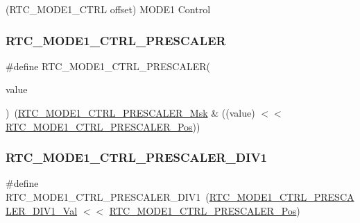 (R\+T\+C\+\_\+\+M\+O\+D\+E1\+\_\+\+C\+T\+RL offset) M\+O\+D\+E1 Control 

\mbox{\label{group___s_a_m_d21___r_t_c_ga3b196a5184695fdb72fe592b985c40ab}} 
\subsubsection{\texorpdfstring{RTC\_MODE1\_CTRL\_PRESCALER}{RTC\_MODE1\_CTRL\_PRESCALER}}
{\footnotesize\ttfamily \#define R\+T\+C\+\_\+\+M\+O\+D\+E1\+\_\+\+C\+T\+R\+L\+\_\+\+P\+R\+E\+S\+C\+A\+L\+ER(\begin{DoxyParamCaption}\item[{}]{value }\end{DoxyParamCaption})~(\mbox{\hyperlink{group___s_a_m_d21___r_t_c_gacda3da44b3dc815688b08e5ce991bc64}{R\+T\+C\+\_\+\+M\+O\+D\+E1\+\_\+\+C\+T\+R\+L\+\_\+\+P\+R\+E\+S\+C\+A\+L\+E\+R\+\_\+\+Msk}} \& ((value) $<$$<$ \mbox{\hyperlink{group___s_a_m_d21___r_t_c_gad44b853d16e29aa5a84f3bb4087a6e1e}{R\+T\+C\+\_\+\+M\+O\+D\+E1\+\_\+\+C\+T\+R\+L\+\_\+\+P\+R\+E\+S\+C\+A\+L\+E\+R\+\_\+\+Pos}}))}

\mbox{\label{group___s_a_m_d21___r_t_c_ga98d73bfed4154ef54d6d2f4df08c0cff}} 
\subsubsection{\texorpdfstring{RTC\_MODE1\_CTRL\_PRESCALER\_DIV1}{RTC\_MODE1\_CTRL\_PRESCALER\_DIV1}}
{\footnotesize\ttfamily \#define R\+T\+C\+\_\+\+M\+O\+D\+E1\+\_\+\+C\+T\+R\+L\+\_\+\+P\+R\+E\+S\+C\+A\+L\+E\+R\+\_\+\+D\+I\+V1~(\mbox{\hyperlink{group___s_a_m_d21___r_t_c_ga6ca17444586d0f47860a5b37b620c2fb}{R\+T\+C\+\_\+\+M\+O\+D\+E1\+\_\+\+C\+T\+R\+L\+\_\+\+P\+R\+E\+S\+C\+A\+L\+E\+R\+\_\+\+D\+I\+V1\+\_\+\+Val}} $<$$<$ \mbox{\hyperlink{group___s_a_m_d21___r_t_c_gad44b853d16e29aa5a84f3bb4087a6e1e}{R\+T\+C\+\_\+\+M\+O\+D\+E1\+\_\+\+C\+T\+R\+L\+\_\+\+P\+R\+E\+S\+C\+A\+L\+E\+R\+\_\+\+Pos}})}

